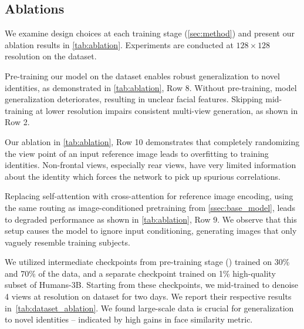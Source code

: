 



\subsection{Ablations}


We examine design choices at each training stage (\cref{sec:method}) and present our ablation results in \cref{tab:ablation}. Experiments are conducted at $128\times128$ resolution on the \upperbody dataset.



 Pre-training our model on the \ig dataset enables robust generalization to novel identities, as demonstrated in \cref{tab:ablation}, Row 8. Without pre-training, model generalization deteriorates, resulting in unclear facial features. Skipping mid-training at lower resolution impairs consistent multi-view generation, as shown in Row 2.

 Our ablation in \cref{tab:ablation}, Row 10 demonstrates that completely randomizing the view point of an input reference image leads to overfitting to training identities. Non-frontal views, especially rear views, have very limited information about the identity which forces the network to pick up spurious correlations.


 Replacing self-attention with cross-attention for reference image encoding, using the same routing as image-conditioned pretraining from \cref{ssec:base_model}, leads to degraded performance as shown in \cref{tab:ablation}, Row 9.
We observe that this setup causes the model to ignore input conditioning, generating images that only vaguely resemble training subjects.

 We utilized intermediate checkpoints from pre-training stage (\pre) trained on 30\% and 70\% of the data, and a separate checkpoint trained on 1\% high-quality subset of Humans-3B. 
Starting from these checkpoints, we mid-trained \ourmodel to denoise 4 views at \resone resolution on \fullbody dataset for two days. We report their respective results in~\cref{tab:dataset_ablation}. 
We found large-scale data is crucial for generalization to novel identities -- indicated by high gains in face similarity metric. 



